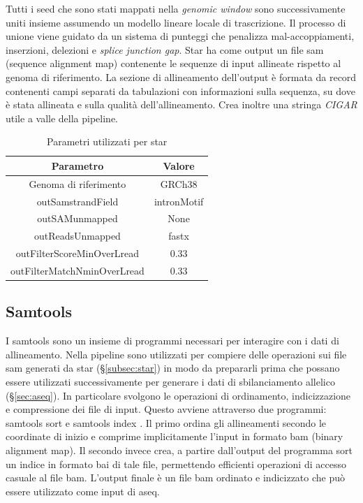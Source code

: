         Tutti i seed che sono stati mappati nella \emph{genomic window} sono successivamente uniti insieme assumendo un modello lineare locale di trascrizione.
	Il processo di unione viene guidato da un sistema di punteggi che penalizza mal-accoppiamenti, inserzioni, delezioni e \emph{splice junction gap}.
	Star ha come output un file sam (sequence alignment map) contenente le sequenze di input allineate rispetto al genoma di riferimento.
        La sezione di allineamento dell'output \`e formata da record contenenti campi separati da tabulazioni con informazioni sulla sequenza, su dove \`e stata allineata e sulla qualit\`a dell'allineamento.
        Crea inoltre una stringa \emph{CIGAR} utile a valle della pipeline.
        \begin{table}[H]
              \centering
              \begin{tabular}{|c|c|}
                      \hline
                      Parametro & Valore\\
                      \hline
                      Genoma di riferimento & GRCh38\\
                      \hline
                      outSamstrandField & intronMotif\\
                      \hline
                      outSAMunmapped & None\\
                      \hline
                      outReadsUnmapped & fastx\\
                      \hline
                      outFilterScoreMinOverLread & $0.33$\\
                      \hline
                      outFilterMatchNminOverLread & $0.33$\\
                      \hline
              \end{tabular}
              \caption{Parametri utilizzati per star}
        \end{table}

	\subsection{Samtools}
	I samtools \cite{samtools} sono un insieme di programmi necessari per interagire con i dati di allineamento.
	Nella pipeline sono utilizzati per compiere delle operazioni sui file sam generati da star (\S\ref{subsec:star}) in modo da prepararli prima che possano essere utilizzati successivamente per generare i dati di sbilanciamento allelico (\S\ref{sec:aseq}).
        In particolare svolgono le operazioni di ordinamento, indicizzazione e compressione dei file di input.
        Questo avviene attraverso due programmi: samtools sort \cite{samtools-sort} e samtools index \cite{samtools-index}.
        Il primo ordina gli allineamenti secondo le coordinate di inizio e comprime implicitamente l'input in formato bam (binary alignment map).
        Il secondo invece crea, a partire dall'output del programma sort un indice in formato bai di tale file, permettendo efficienti operazioni di accesso casuale al file bam.
        L'output finale \`e un file bam ordinato e indicizzato che pu\`o essere utilizzato come input di aseq.

